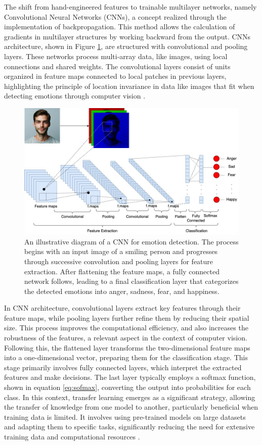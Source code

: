 \documentclass[runningheads]{llncs}
\begin{document}
The shift from hand-engineered features to trainable multilayer networks, namely Convolutional Neural Networks (CNNs), a concept realized through the implementation of backpropagation. This method allows the calculation of gradients in multilayer structures by working backward from the output. CNNs architecture, shown in Figure \ref{fig:cnnarchitecture}, are structured with convolutional and pooling layers. These networks process multi-array data, like images, using local connections and shared weights. The convolutional layers consist of units organized in feature maps connected to local patches in previous layers, highlighting the principle of location invariance in data like images that fit when detecting emotions through computer vision \cite{Lecun2015}.

\begin{figure}[htb]
\centering
\includegraphics[width=0.97\linewidth]{CNNArchitecture.jpg}
\caption{An illustrative diagram of a CNN for emotion detection. The process begins with an input image of a smiling person and progresses through successive convolution and pooling layers for feature extraction. After flattening the feature maps, a fully connected network follows, leading to a final classification layer that categorizes the detected emotions into anger, sadness, fear, and happiness.}
\label{fig:cnnarchitecture}
\end{figure}

In CNN architecture, convolutional layers extract key features through their feature maps, while pooling layers further refine them by reducing their spatial size. This process improves the computational efficiency, and also increases the robustness of the features, a relevant aspect in the context of computer vision. Following this, the flattened layer transforms the two-dimensional feature maps into a one-dimensional vector, preparing them for the classification stage. This stage primarily involves fully connected layers, which interpret the extracted features and make decisions. The last layer typically employs a softmax function, shown in equation \ref{eq:sofmax}, converting the output into probabilities for each class. In this context, transfer learning emerges as a significant strategy, allowing the transfer of knowledge from one model to another, particularly beneficial when training data is limited. It involves using pre-trained models on large datasets and adapting them to specific tasks, significantly reducing the need for extensive training data and computational resources \cite{Khan2020}.
\end{document}

